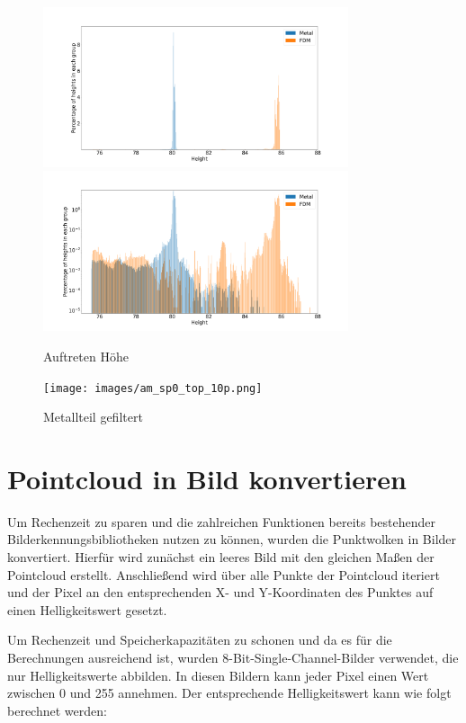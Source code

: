 \begin{figure}
    \centering
    \includegraphics[width=0.8\textwidth]{images/height_occurange.png}
    \includegraphics[width=0.8\textwidth]{images/height_occurange_log.png}
    \caption{Auftreten Höhe}
    \label{fig:brightness}
\end{figure}

\begin{figure}
    \centering
    \texttt{[image: images/am\_sp0\_top\_10p.png]}
    \caption{Metallteil gefiltert}
    \label{fig:metall_image}
\end{figure}

\section{Pointcloud in Bild konvertieren}

Um Rechenzeit zu sparen und die zahlreichen Funktionen bereits bestehender
 Bilderkennungsbibliotheken nutzen zu können, wurden die Punktwolken in Bilder 
 konvertiert. Hierfür wird zunächst ein leeres Bild mit den gleichen 
 Maßen der Pointcloud erstellt. Anschließend wird über alle Punkte der
 Pointcloud iteriert und der Pixel an den 
 entsprechenden X- und Y-Koordinaten des Punktes auf einen Helligkeitswert gesetzt.

Um Rechenzeit und Speicherkapazitäten zu schonen und 
da es für die Berechnungen ausreichend ist, wurden 
8-Bit-Single-Channel-Bilder verwendet, die nur Helligkeitswerte abbilden. 
In diesen Bildern kann jeder Pixel einen Wert zwischen 0 und 255 annehmen. 
Der entsprechende Helligkeitswert kann wie folgt berechnet werden:


